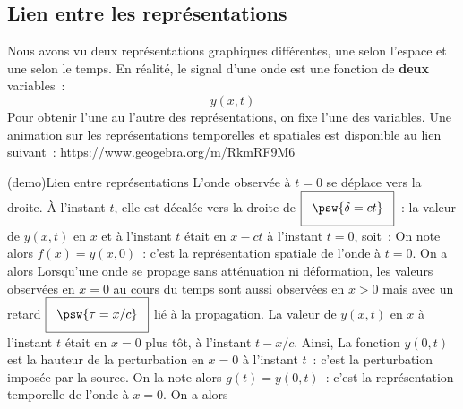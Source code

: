\documentclass[../../main/main.tex]{subfiles}
\begin{document}
\subsection{Lien entre les représentations}
Nous avons vu deux représentations graphiques différentes, une selon l'espace et
une selon le temps. En réalité, le signal d'une onde est une fonction de
\textbf{deux} variables~:
\[y(x,t)\]
Pour obtenir l'une au l'autre des représentations, on fixe l'une des variables.
Une animation sur les représentations temporelles et spatiales est disponible au
lien suivant~: \url{https://www.geogebra.org/m/RkmRF9M6}

\begin{tcb*}(demo){Lien entre représentations}
	L'onde observée à $t=0$ se déplace vers la droite. À l'instant $t$, elle est
	décalée vers la droite de $\setlength{\fboxsep}{3mm} \boxed{\psw{\delta =
				ct}}$~: la valeur de $y(x,t)$ en $x$ et à l'instant $t$ était en $x-ct$
	à l'instant $t=0$, soit~:
	\psw{%
		\[
			y(x,t) = y(x-ct,0)
		\]
	}%
	On note alors $f(x) = y(x,0)$~: c'est la représentation spatiale de l'onde à
	$t=0$. On a alors
	\psw{%
		\[\boxed{
				y(x,t) = f(x-ct)
			}\]
	}%
	\vspace{-15pt}
	\tcblower
	Lorsqu'une onde se propage sans atténuation ni déformation, les valeurs
	observées en $x = 0$ au cours du temps sont aussi observées en $x > 0$ mais
	avec un retard $\setlength{\fboxsep}{3mm}\boxed{\psw{\tau = x/c}}$ lié à la
	propagation. La valeur de $y(x, t)$ en $x$ à l'instant $t$ était en $x = 0$
	plus tôt, à l'instant $t - x/c$. Ainsi,
	\psw{%
		\[
			y(x,t) = y\left(0,t-\frac{x}{c}\right)
		\]
	}%
	La fonction $y(0,t)$ est la hauteur de la perturbation en $x=0$ à l'instant
	$t$~: c'est la perturbation imposée par la source. On la note alors $g(t) =
		y(0,t)$~: c'est la représentation temporelle de l'onde à $x=0$. On a alors
	\psw{%
		\[\boxed{
				y(x,t) = g\left(t-\frac{x}{c}\right)
			}\]
	}%
\end{tcb*}
\end{document}
